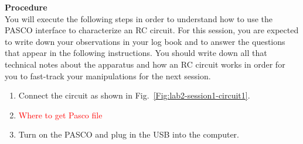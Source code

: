 \documentclass[12pt]{report}
\def \todo #1{\textcolor{red}{#1}}
\begin{document}
\noindent \large \textbf{Procedure} \normalsize \\
You will execute the following steps in order to understand how to use the PASCO interface to characterize an RC circuit. For this session, you are expected to write down your observations in your log book and to answer the questions that appear in the following instructions. You should write down all that technical notes about the apparatus and how an RC circuit works in order for you to fast-track your manipulations for the next session.
\begin{enumerate}
\item Connect the circuit as shown in Fig.~\ref{Fig:lab2-session1-circuit1}.
\item \todo{Where to get Pasco file}
\item Turn on the PASCO and plug in the USB into the computer.


\end{enumerate}
\end{document}
